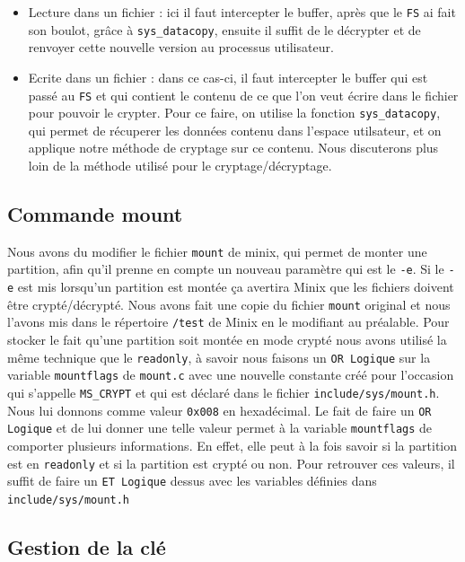 \documentclass[10pt, onecolumn] {IEEEtran}
\begin{document}
\begin{itemize}
\item Lecture dans un fichier : ici il faut intercepter le buffer, après que le \texttt{FS} ai fait son boulot, grâce à \texttt{sys\_datacopy}, ensuite il suffit de le décrypter et de renvoyer cette nouvelle version au processus utilisateur.
\item Ecrite dans un fichier : dans ce cas-ci, il faut intercepter le buffer qui est passé au \texttt{FS} et qui contient le contenu de ce que l'on veut écrire dans le fichier pour pouvoir le crypter. Pour ce faire, on utilise la fonction \texttt{sys\_datacopy}, qui permet de récuperer les données contenu dans l'espace utilsateur, et on applique notre méthode de cryptage sur ce contenu. Nous discuterons plus loin de la méthode utilisé pour le cryptage/décryptage.
\end{itemize}

\subsection{Commande mount}

Nous avons du modifier le fichier \texttt{mount} de minix, qui permet de monter une partition, afin qu'il prenne en compte un nouveau paramètre qui est le \texttt{-e}. Si le \texttt{-e} est mis lorsqu'un partition est montée ça avertira Minix que les fichiers doivent être crypté/décrypté.
Nous avons fait une copie du fichier \texttt{mount} original et nous l'avons mis dans le répertoire \texttt{/test} de Minix en le modifiant au préalable.
Pour stocker le fait qu'une partition soit montée en mode crypté nous avons utilisé la même technique que le \texttt{readonly}, à savoir nous faisons un \texttt{OR Logique} sur la variable \texttt{mountflags} de \texttt{mount.c} avec une nouvelle constante créé pour l'occasion qui s'appelle \texttt{MS\_CRYPT} et qui est déclaré dans le fichier \texttt{include/sys/mount.h}. Nous lui donnons comme valeur \texttt{0x008} en hexadécimal.
Le fait de faire un \texttt{OR Logique} et de lui donner une telle valeur permet à la variable \texttt{mountflags} de comporter plusieurs informations. En effet, elle peut à la fois savoir si la partition est en \texttt{readonly} et si la partition est crypté ou non. Pour retrouver ces valeurs, il suffit de faire un \texttt{ET Logique} dessus avec les variables définies dans \texttt{include/sys/mount.h}

\subsection{Gestion de la clé}
\end{document}
